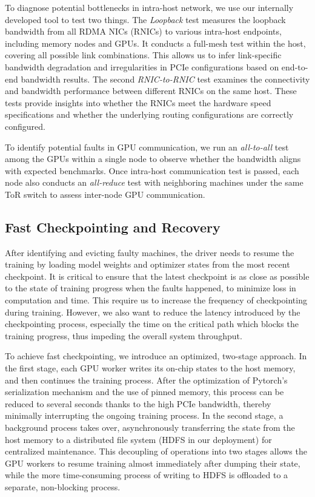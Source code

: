  To diagnose potential bottlenecks in
intra-host network, we use our internally developed tool to test two things. The
\textit{Loopback} test measures the loopback bandwidth from all RDMA NICs
(RNICs) to various intra-host endpoints, including memory nodes and GPUs. It
conducts a full-mesh test within the host, covering all possible link
combinations. This allows us to infer link-specific bandwidth degradation and
irregularities in PCIe configurations based on end-to-end bandwidth results. The
second \textit{RNIC-to-RNIC} test examines the connectivity and bandwidth
performance between different RNICs on the same host. These tests provide
insights into whether the RNICs meet the hardware speed specifications and
whether the underlying routing configurations are correctly configured.


 To identify potential faults in GPU communication, we run
an \textit{all-to-all} test among the GPUs within a single node to observe
whether the bandwidth aligns with expected benchmarks. Once intra-host
communication test is passed, each node also conducts an \textit{all-reduce}
test with neighboring machines under the same ToR switch to assess inter-node
GPU communication.




\subsection{Fast Checkpointing and Recovery}
\label{sec:checkpoint}

After identifying and evicting faulty machines, the driver needs to resume the
training by loading model weights and optimizer states from the most recent
checkpoint. It is critical to ensure that the latest
checkpoint is as close as possible to the state of training progress when the
faults happened, to minimize loss in computation and time. This require us
to increase the frequency of checkpointing during training. However, we also
want to reduce the latency introduced by the checkpointing process, especially
the time on the critical path which blocks the training progress, thus impeding
the overall system throughput.

To achieve fast checkpointing, we introduce an optimized, two-stage approach. In
the first stage, each GPU worker writes its on-chip states to the host memory,
and then continues the training process. After the optimization of Pytorch's
serialization mechanism and the use of pinned memory, this process can be
reduced to several seconds thanks to the high PCIe bandwidth, thereby minimally
interrupting the ongoing training process. In the second stage, a background
process takes over, asynchronously transferring the state from the host memory
to a distributed file system (HDFS in our deployment) for centralized maintenance. This decoupling of operations into two
stages allows the GPU workers to resume training almost immediately after
dumping their state, while the more time-consuming process of writing to HDFS is
offloaded to a separate, non-blocking process.

